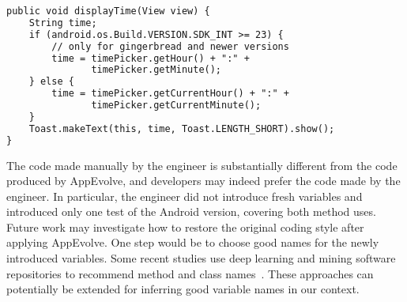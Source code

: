 \vspace{0.7cm}
\vspace{0.5cm}\begin{lstlisting}[language=diff,numbers=none]
public void displayTime(View view) {
    String time;
    if (android.os.Build.VERSION.SDK_INT >= 23) {
        // only for gingerbread and newer versions
        time = timePicker.getHour() + ":" +
               timePicker.getMinute();
    } else {
        time = timePicker.getCurrentHour() + ":" +
               timePicker.getCurrentMinute();
    }
    Toast.makeText(this, time, Toast.LENGTH_SHORT).show();
}
\end{lstlisting}


\vspace{0.5cm}The code made manually by the engineer is substantially
different from the code produced by AppEvolve, and developers may indeed
prefer the code made by the engineer. In particular, the engineer did not
introduce fresh variables and introduced only one test of the Android
version, covering both method uses.  Future work may investigate how to
restore the original coding style after applying AppEvolve. One step would
be to choose good names for the newly introduced variables. Some recent
studies use deep learning and mining software repositories to recommend
method and class names~\cite{allamanis2015suggesting}. These approaches can
potentially be extended for inferring good variable names in our context.
